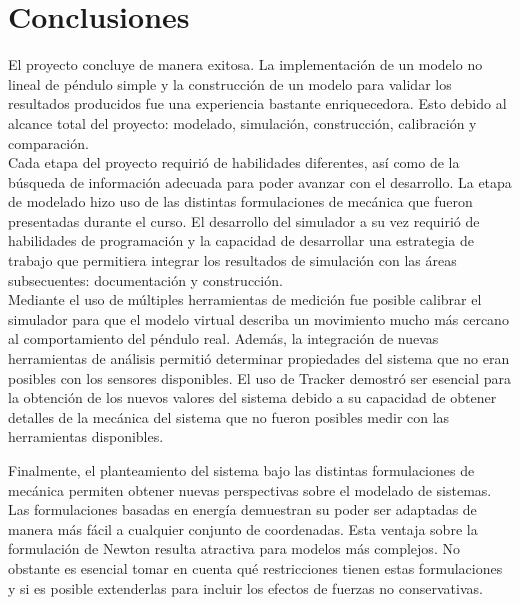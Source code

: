 \section{Conclusiones}
El proyecto concluye de manera exitosa.
La implementación de un modelo no lineal de péndulo simple y la construcción
de un modelo para validar los resultados producidos 
fue una experiencia bastante enriquecedora.
Esto debido al alcance total del proyecto: modelado,
simulación, construcción, calibración y comparación.\\

Cada etapa del proyecto requirió de habilidades diferentes, así como 
de la búsqueda de información adecuada para poder avanzar con el desarrollo.
La etapa de modelado hizo uso de las distintas formulaciones de mecánica 
que fueron presentadas durante el curso.
El desarrollo del simulador a su vez requirió de habilidades de programación
 y la capacidad de desarrollar una estrategia de trabajo que permitiera integrar
 los resultados de simulación con las áreas subsecuentes: documentación y construcción.\\

Mediante el uso de múltiples herramientas de medición fue posible calibrar el 
simulador para que el modelo virtual describa un movimiento mucho 
más cercano al comportamiento del péndulo real.
Además, la integración de nuevas herramientas de análisis permitió determinar 
propiedades del sistema que no eran posibles con los sensores disponibles.
El uso de Tracker demostró ser esencial para la obtención de los nuevos valores
del sistema debido a su capacidad de obtener detalles de la mecánica del sistema
que no fueron posibles medir con las herramientas disponibles.

Finalmente, el planteamiento del sistema bajo las distintas formulaciones 
de mecánica permiten obtener nuevas perspectivas sobre el modelado de sistemas.
Las formulaciones basadas en energía demuestran su poder ser adaptadas
de manera más fácil a cualquier conjunto de coordenadas.
Esta ventaja sobre la formulación de Newton resulta atractiva para modelos más complejos.
No obstante es esencial tomar en cuenta qué restricciones tienen estas formulaciones
y si es posible extenderlas para incluir los efectos de fuerzas no conservativas.
